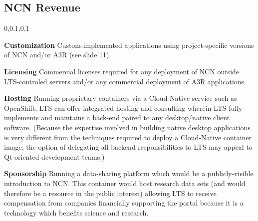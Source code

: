 
\begin{frame}{}
\section{NCN Revenue}
\vspace{-.5em}	

{\selectfont
\hspace*{-20pt}\begin{minipage}{1.1\textwidth}
\vspace{4pt}


		
\begin{lightquadblockc}{0,0.1,0.1}{}
\begin{center}\begin{minipage}{1.05\textwidth}
{\fontsize{16}{23}\selectfont \setlength{\leftmargini}{30pt}\begin{enumerate}
\dmitem \textbf{Customization} \hspace{.5em} Custom-implemented applications 
using project-specific versions of NCN and/or A3R 
(see slide 11).\vspace{10pt}

\dmitem \textbf{Licensing}  \hspace{.5em} Commercial licenses required for 
any deployment of NCN outside LTS-controled 
servers and/or any commercial deployment of A3R 
applications.\vspace{10pt}

\dmitem \textbf{Hosting}  \hspace{.5em} Running proprietary 
containers via a Cloud-Native service such as 
OpenShift, LTS can offer integrated hosting and consulting 
wherein LTS fully implements and maintains a back-end 
paired to any desktop/native client software.
(Because the expertise involved 
in building native desktop applications is very different 
from the techniques required to deploy a Cloud-Native container 
image, the option of delegating all 
backend responsibilities to LTS may 
appeal to Qt-oriented development teams.)\vspace{10pt}

\dmitem \textbf{Sponsorship}  \hspace{.5em} 
Running a data-sharing platform which would be a 
publicly-visible introduction to NCN.  
This  container 
would host research data sets (and 
would therefore be a resource in the public 
interest) allowing LTS to receive compensation 
from companies financially supporting the 
portal because it is a technology which
benefits science and research.
\end{enumerate}
}\end{minipage}
\end{center}
\end{lightquadblockc}
\end{minipage}

}

\end{frame}
